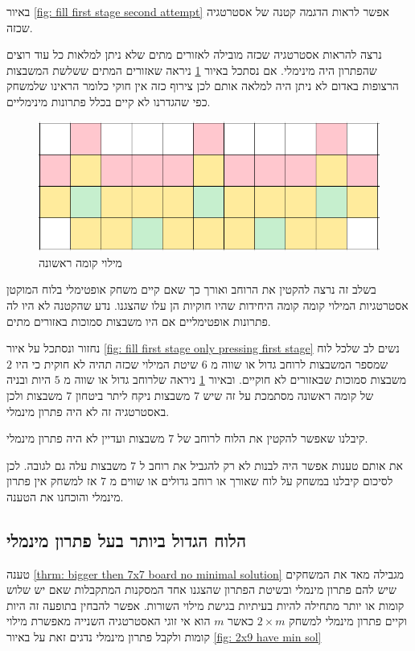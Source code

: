 \documentclass[12pt,twoside]{article}
\begin{document}
באיור 
\ref{fig: fill first stage second attempt}
אפשר לראות הדגמה קטנה של אסטרטגיה שכזה.

נרצה להראות אסטרטגיה שכזה מובילה לאזורים מתים שלא ניתן למלאות 
כל עוד רוצים שהפתרון היה מינימלי.
אם נסתכל באיור 
\ref{fig: fill first stage second attempt fails}
ניראה שאזורים המתים ששלשת
המשבצות הרצופות באדום לא ניתן היה למלאה אותם לכן צירוף כזה אין חוקי
כלומר הראינו שלמשחק כפי שהגדרנו לא קיים בכלל פתרונות מינימליים.

\begin{figure}[ht]
    \caption{מילוי קומה ראשונה}
    \label{fig: fill first stage second attempt fails}
    \centering
    \includegraphics[width=.7\textwidth,height=.7\textheight,keepaspectratio]{images/first_stage_fill_only_first_stage_click_fail.PNG}
\end{figure}

בשלב זה נרצה להקטין את הרוחב ואורך כך שאם קיים 
משחק אופטימלי בלוח המוקטן אסטרטגיות המילוי קומה קומה היחידות 
שהיו חוקיות הן עלו שהצגנו.
נדע שהקטנה לא היו לה פתרונות אופטימליים אם היו משבצות סמוכות באזורים מתים.

נחזור ונסתכל על איור 
\ref{fig: fill first stage only pressing first stage}
נשים לב שלכל לוח שמספר המשבצות לרוחב גדול או שווה 
מ
$6$
שיטת המילוי שכזה תהיה לא חוקית כי היו 
$2$
משבצות סמוכות שבאזורים לא חוקיים.
ובאיור 
\ref{fig: fill first stage second attempt fails}
ניראה
שלרוחב גדול או שווה 
מ
$5$
היות ובניה
של קומה ראשונה מסתמכת על זה שיש 
$7$
משבצות ניקח ליתר ביטחון 
$7$
משבצות ולכן באסטרטגיה זה לא היה פתרון מינמלי.

קיבלנו שאפשר להקטין את הלוח לרוחב של
$7$
משבצות 
ועדיין לא היה פתרון  מינמלי. 

את אותם טענות אפשר היה לבנות לא רק להגביל את רוחב ל
$7$
משבצות עלה גם לגובה.
לכן לסיכום קיבלנו 
במשחק על לוח 
שאורך או רוחב גדולים או שווים מ
$7$
אז
למשחק אין פתרון מינמלי
והוכחנו את הטענה.


\subsection{הלוח הגדול ביותר בעל פתרון מינמלי}
טענה 
\ref{thrm: bigger then 7x7 board no minimal solution} 
מגבילה מאד את המשחקים שיש להם פתרון מינמלי ובשיטת הפתרון שהצגנו
אחד המסקנות המתקבלות שאם יש שלוש קומות או יותר מתחילה
להיות בעיתיות בגישת מילוי השורות.
אפשר להבחין בתופעה זה היות וקיים פתרון מינמלי למשחק 
$2 \times m$
כאשר 
$m$
הוא אי זוגי
האסטרטגיה השנייה מאפשרת מילוי קומות ולקבל פתרון מינמלי
נדגים זאת על באיור 
\ref{fig: 2x9 have min sol}
\end{document}
